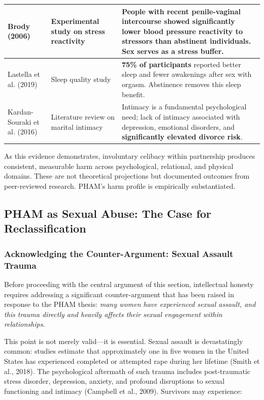 \documentclass[12pt, letterpaper]{article}
\begin{document}
\begin{longtable}{|p{2.8cm}|p{3.5cm}|p{7.5cm}|}
Brody (2006) & Experimental study on stress reactivity & People with recent penile-vaginal intercourse showed \textbf{significantly lower blood pressure reactivity} to stressors than abstinent individuals. Sex serves as a stress buffer. \\
\hline

Lastella et al. (2019) & Sleep quality study & \textbf{75\% of participants} reported better sleep and fewer awakenings after sex with orgasm. Abstinence removes this sleep benefit. \\
\hline

Kardan-Souraki et al. (2016) & Literature review on marital intimacy & Intimacy is a fundamental psychological need; lack of intimacy associated with depression, emotional disorders, and \textbf{significantly elevated divorce risk}. \\
\hline
\end{longtable}

\noindent As this evidence demonstrates, involuntary celibacy within partnership produces consistent, measurable harm across psychological, relational, and physical domains. These are not theoretical projections but documented outcomes from peer-reviewed research. PHAM's harm profile is empirically substantiated.

\subsection{PHAM as Sexual Abuse: The Case for Reclassification}

\subsubsection{Acknowledging the Counter-Argument: Sexual Assault Trauma}

Before proceeding with the central argument of this section, intellectual honesty requires addressing a significant counter-argument that has been raised in response to the PHAM thesis: \textit{many women have experienced sexual assault, and this trauma directly and heavily affects their sexual engagement within relationships}.

This point is not merely valid---it is essential. Sexual assault is devastatingly common: studies estimate that approximately one in five women in the United States has experienced completed or attempted rape during her lifetime (Smith et al., 2018). The psychological aftermath of such trauma includes post-traumatic stress disorder, depression, anxiety, and profound disruptions to sexual functioning and intimacy (Campbell et al., 2009). Survivors may experience:
\end{document}
